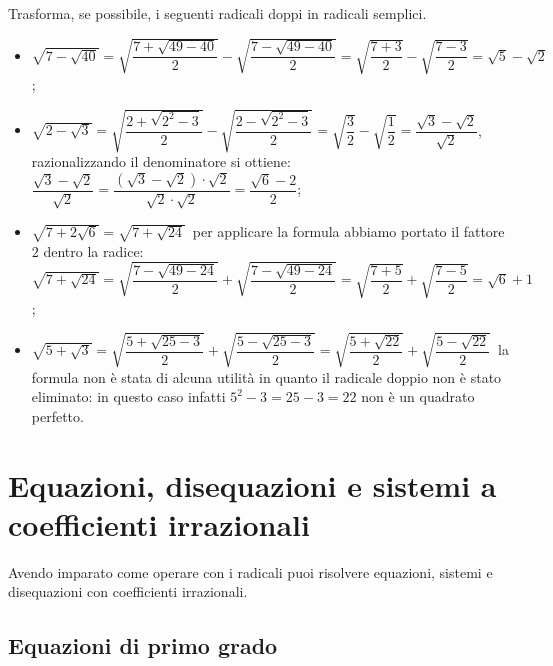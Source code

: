 \begin{exrig}
 \begin{esempio}
Trasforma, se possibile, i seguenti radicali doppi in radicali semplici.
\begin{itemize}
 \item $\sqrt{7-\sqrt{40}}=\sqrt{\dfrac{7+\sqrt{49-40}} 2}-\sqrt{\dfrac{7-\sqrt{49-40}} 2}=\sqrt{\dfrac{7+3} 2}-\sqrt{\dfrac{7-3} 2}=\sqrt 5-\sqrt 2$;
 \item $\sqrt{2-\sqrt 3}=\sqrt{\dfrac{2+\sqrt{2^2-3}} 2}-\sqrt{\dfrac{2-\sqrt{2^2-3}} 2}=\sqrt{\dfrac 3 2}-\sqrt{\dfrac 1 2}=\dfrac{\sqrt 3-\sqrt 2}{\sqrt 2}$, razionalizzando il denominatore si ottiene: $\dfrac{\sqrt 3-\sqrt 2}{\sqrt 2}=\dfrac{(\sqrt 3-\sqrt 2)\cdot \sqrt 2}{\sqrt 2\cdot \sqrt 2}=\dfrac{\sqrt 6-2} 2$;
 \item $\sqrt{7+2\sqrt 6}=\sqrt{7+\sqrt{24}}$\, per applicare la formula abbiamo portato il fattore $2$ dentro la radice: $\sqrt{7+\sqrt{24}}=\sqrt{\dfrac{7-\sqrt{49-24}} 2}+\sqrt{\dfrac{7-\sqrt{49-24}} 2}=\sqrt{\dfrac{7+5} 2}+\sqrt{\dfrac{7-5} 2}=\sqrt 6+1$;
 \item $\sqrt{5+\sqrt 3}=\sqrt{\dfrac{5+\sqrt{25-3}} 2}+\sqrt{\dfrac{5-\sqrt{25-3}} 2}=\sqrt{\dfrac{5+\sqrt{22}} 2}+\sqrt{\dfrac{5-\sqrt{22}} 2}$\, la formula non è stata di alcuna utilità in quanto il radicale doppio non è stato eliminato: in questo caso infatti $5^2-3 = 25-3=22$ non è un quadrato perfetto.
\end{itemize}
 \end{esempio}
\end{exrig}
\vspazio\ovalbox{\risolvii \ref{ese:2.77}, \ref{ese:2.78}, \ref{ese:2.79}}

\section{Equazioni, disequazioni e sistemi a coefficienti irrazionali}

Avendo imparato come operare con i radicali puoi risolvere equazioni, sistemi e disequazioni con coefficienti irrazionali.

\subsection{Equazioni di primo grado}

